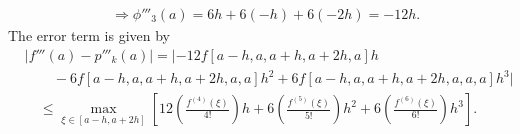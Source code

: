 \documentclass[a4paper,12pt]{article}
\begin{document}
\begin{enumerate}
\begin{align*}
            &\Rightarrow \phi'''_3(a) = 6h + 6(-h) + 6(-2h) = -12h.
        \end{align*}
        The error term is given by
        \begin{align*}
            &|f'''(a) - p'''_k(a)| = \bigl| {-12}f[a - h, a, a + h, a + 2h, a]h \\
            &\qquad{} - 6f[a - h, a, a + h, a + 2h, a, a]h^2 + 6f[a - h, a, a + h, a + 2h, a, a, a]h^3 \bigr| \\
            &\quad{} \leq \max_{\xi \in [a - h, a + 2h]} \left[ 12 \left( \frac{f^{(4)}(\xi)}{4!} \right)h + 6 \left( \frac{f^{(5)}(\xi)}{5!} \right)h^2 + 6 \left( \frac{f^{(6)}(\xi)}{6!} \right)h^3 \right].
        \end{align*}
\end{enumerate}
\end{document}
